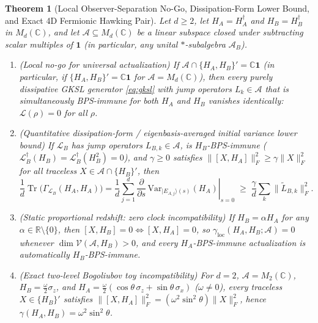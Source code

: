 \documentclass[11pt,a4paper]{article}
\newtheorem{theorem}{Theorem}
\theoremstyle{definition}
\theoremstyle{remark}
\newcommand{\Tr}{\operatorname{Tr}}
\newcommand{\cA}{\mathcal{A}}
\newcommand{\cL}{\mathcal{L}}
\newcommand{\bbC}{\mathbb{C}}
\newcommand{\bbR}{\mathbb{R}}
\newcommand{\1}{\mathbf{1}}
\newcommand{\normF}[1]{\|#1\|_F}
\begin{document}
\begin{theorem}[Local Observer-Separation No-Go, Dissipation-Form Lower Bound, and Exact 4D Fermionic Hawking Pair]\label{thm:horizon}
Let $d \ge 2$, let $H_A = H_A^\dagger$ and $H_B = H_B^\dagger$ in $M_d(\bbC)$, and let $\cA \subseteq M_d(\bbC)$ be a linear subspace closed under subtracting scalar multiples of $\1$ (in particular, any unital $*$-subalgebra $\cA_B$).
\begin{enumerate}
  \item[(a)] \emph{(Local no-go for universal actualization)} If $\cA \cap \{H_A, H_B\}' = \bbC\1$ (in particular, if $\{H_A,H_B\}'=\bbC\1$ for $\cA = M_d(\bbC)$), then every purely dissipative GKSL generator \eqref{eq:gksl} with jump operators $L_k \in \cA$ that is simultaneously BPS-immune for both $H_A$ and $H_B$ vanishes identically: $\cL(\rho) = 0$ for all $\rho$.
  \item[(b)] \emph{(Quantitative dissipation-form / eigenbasis-averaged initial variance lower bound)} If $\cL_B$ has jump operators $L_{B,k} \in \cA$, is $H_B$-BPS-immune ($\cL_B^\dagger(H_B)=\cL_B^\dagger(H_B^2)=0$), and $\gamma \ge 0$ satisfies $\normF{[X,H_A]}^2 \ge \gamma\normF{X}^2$ for all traceless $X \in \cA \cap \{H_B\}'$, then
  \begin{equation}\label{eq:heating-bound}
    \frac{1}{d}\Tr\bigl(\Gamma_{\cL_B}(H_A, H_A)\bigr)
    = \frac{1}{d}\sum_{j=1}^d \left.\frac{\partial}{\partial s}\,\mathrm{Var}_{|E_{A,j}\rangle(s)}(H_A)\right|_{s=0}
    \;\ge\; \frac{\gamma}{d}\sum_k \normF{\tilde{L}_{B,k}}^2.
  \end{equation}
  \item[(c)] \emph{(Static proportional redshift: zero clock incompatibility)} If $H_B = \alpha H_A$ for any $\alpha \in \bbR\setminus\{0\}$, then $[X, H_B] = 0 \iff [X, H_A] = 0$, so $\gamma_{\mathrm{loc}}(H_A, H_B; \cA) = 0$ whenever $\dim\mathcal{V}(\cA,H_B)>0$, and every $H_A$-BPS-immune actualization is automatically $H_B$-BPS-immune.
  \item[(d)] \emph{(Exact two-level Bogoliubov toy incompatibility)} For $d=2$, $\cA = M_2(\bbC)$, $H_B = \frac{\omega}{2}\sigma_z$, and $H_A = \frac{\omega}{2}(\cos\theta\,\sigma_z + \sin\theta\,\sigma_x)$ ($\omega \neq 0$), every traceless $X \in \{H_B\}'$ satisfies $\normF{[X, H_A]}^2 = (\omega^2 \sin^2\theta)\normF{X}^2$, hence $\gamma(H_A, H_B) = \omega^2\sin^2\theta$.

\end{enumerate}
\end{theorem}
\end{document}
